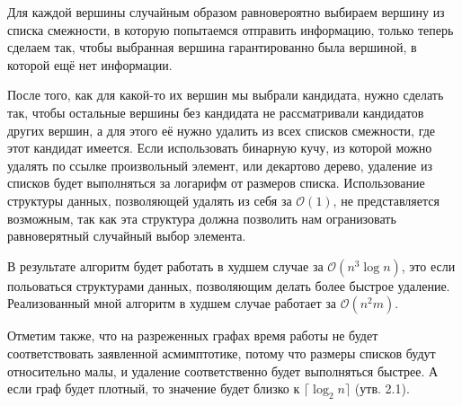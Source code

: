 Для каждой вершины случайным образом равновероятно выбираем вершину из списка смежности, в которую попытаемся отправить информацию, только теперь сделаем так, чтобы выбранная вершина гарантированно была вершиной, в которой ещё нет информации.

После того, как для какой-то их вершин мы выбрали кандидата, нужно сделать так, чтобы остальные вершины без кандидата не рассматривали кандидатов других вершин, а для этого её нужно удалить из всех списков смежности, где этот кандидат имеется. Если использовать бинарную кучу, из которой можно удалять по ссылке произвольный элемент, или декартово дерево, удаление из списков будет выполняться за логарифм от размеров списка. Использование структуры данных, позволяющей удалять из себя за $\mathcal{O}(1)$, не представляется возможным, так как эта структура должна позволить нам огранизовать равноверятный случайный выбор элемента. 

В результате алгоритм будет работать в худшем случае за $\mathcal{O}(n^3 \log n)$, это если польоваться структурами данных, позволяющим делать более быстрое удаление. Реализованный мной алгоритм в худшем случае работает за $\mathcal{O}(n^2m)$. 

Отметим также, что на разреженных графах время работы не будет соответствовать заявленной асмимптотике, потому что размеры списков будут относительно малы, и удаление соответственно будет выполняться быстрее. А если граф будет плотный, то значение будет близко к $\lceil \log _2 n \rceil$ (утв. 2.1).
